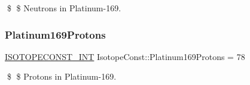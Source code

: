 \$ \$ Neutrons in Platinum-\/169. \mbox{\label{group___isotope_const-_platinum-_pt169_ga570c5eb523558212f092f83aceb8a624}} 
\subsubsection{\texorpdfstring{Platinum169\+Protons}{Platinum169Protons}}
{\footnotesize\ttfamily \mbox{\hyperlink{group___isotope_const-_macros_ga5f18360b3e99483a35c32d789e62621c}{I\+S\+O\+T\+O\+P\+E\+C\+O\+N\+S\+T\+\_\+\+I\+NT}} Isotope\+Const\+::\+Platinum169\+Protons = 78}

\$ \$ Protons in Platinum-\/169. 
